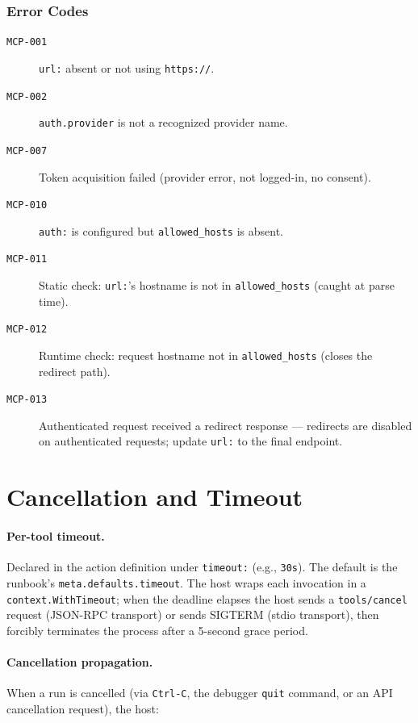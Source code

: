 \subsubsection{Error Codes}

\begin{description}
  \item[\texttt{MCP-001}] \texttt{url:} absent or not using \texttt{https://}.
  \item[\texttt{MCP-002}] \texttt{auth.provider} is not a recognized provider name.
  \item[\texttt{MCP-007}] Token acquisition failed (provider error, not logged-in, no consent).
  \item[\texttt{MCP-010}] \texttt{auth:} is configured but \texttt{allowed\_hosts} is absent.
  \item[\texttt{MCP-011}] Static check: \texttt{url:}'s hostname is not in \texttt{allowed\_hosts} (caught at parse time).
  \item[\texttt{MCP-012}] Runtime check: request hostname not in \texttt{allowed\_hosts} (closes the redirect path).
  \item[\texttt{MCP-013}] Authenticated request received a redirect response --- redirects are disabled on authenticated requests; update \texttt{url:} to the final endpoint.
\end{description}

\section{Cancellation and Timeout}
\label{sec:tool-cancellation}

\paragraph{Per-tool timeout.}
Declared in the action definition under \texttt{timeout:} (e.g., \texttt{30s}).
The default is the runbook's \texttt{meta.defaults.timeout}.  The host wraps
each invocation in a \texttt{context.WithTimeout}; when the deadline elapses
the host sends a \texttt{tools/cancel} request (JSON-RPC transport) or
sends SIGTERM (stdio transport), then forcibly terminates the process after a
5-second grace period.

\paragraph{Cancellation propagation.}
When a run is cancelled (via \texttt{Ctrl-C}, the debugger \texttt{quit}
command, or an API cancellation request), the host:

